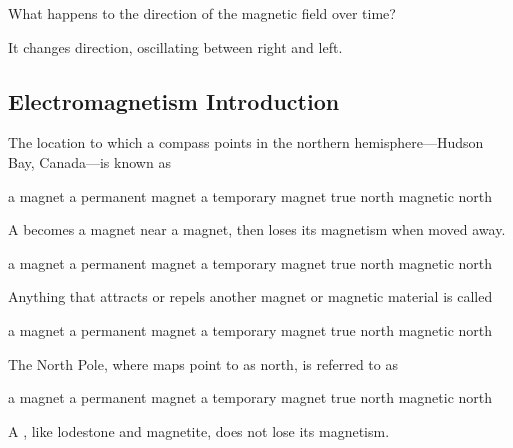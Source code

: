 \documentclass[]{exam}
\begin{document}
\begin{questions}
What happens to the direction of the magnetic field over time?

\ifprintanswers
{\color{red} It changes direction, oscillating between right and left.}
\else
\fillwithlines{1.5cm}
\fi
\end{questions}

\clearpage

\subsection{Electromagnetism Introduction}
    
\begin{questions}

\question
The location to which a compass points in the northern hemisphere---Hudson Bay, Canada---is known as

\begin{randomizechoices}
    \choice a magnet
    \choice a permanent magnet
    \choice a temporary magnet
    \choice true north
    \correctchoice magnetic north
\end{randomizechoices}


\question
A  becomes a magnet near a magnet, then loses its magnetism when moved away.

\begin{randomizechoices}
    \choice a magnet
    \choice a permanent magnet
    \correctchoice a temporary magnet
    \choice true north
    \choice magnetic north
\end{randomizechoices}

\question
Anything that attracts or repels another magnet or magnetic material is called 

\begin{randomizechoices}
    \correctchoice a magnet
    \choice a permanent magnet
    \choice a temporary magnet
    \choice true north
    \choice magnetic north
\end{randomizechoices}

\question
The North Pole, where maps point to as north, is referred to as 

\begin{randomizechoices}
    \choice a magnet
    \choice a permanent magnet
    \choice a temporary magnet
    \correctchoice true north
    \choice magnetic north
\end{randomizechoices}

\question
A , like lodestone and magnetite, does not lose its magnetism.


\end{questions}
\end{document}
